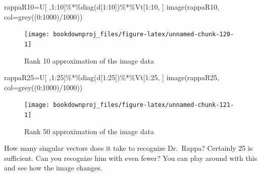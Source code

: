 \documentclass[
]{article}
\newenvironment{Shaded}{\begin{snugshade}}{\end{snugshade}}
\newcommand{\AttributeTok}[1]{\textcolor[rgb]{0.77,0.63,0.00}{#1}}
\newcommand{\DecValTok}[1]{\textcolor[rgb]{0.00,0.00,0.81}{#1}}
\newcommand{\FunctionTok}[1]{\textcolor[rgb]{0.00,0.00,0.00}{#1}}
\newcommand{\NormalTok}[1]{#1}
\newcommand{\OtherTok}[1]{\textcolor[rgb]{0.56,0.35,0.01}{#1}}
\newcommand{\SpecialCharTok}[1]{\textcolor[rgb]{0.00,0.00,0.00}{#1}}
\theoremstyle{definition}
\theoremstyle{definition}
\theoremstyle{definition}
\theoremstyle{definition}
\theoremstyle{remark}
\begin{document}
\begin{Shaded}
\begin{Highlighting}[]
\NormalTok{rappaR10}\OtherTok{=}\NormalTok{U[ ,}\DecValTok{1}\SpecialCharTok{:}\DecValTok{10}\NormalTok{]}\SpecialCharTok{\%*\%}\FunctionTok{diag}\NormalTok{(d[}\DecValTok{1}\SpecialCharTok{:}\DecValTok{10}\NormalTok{])}\SpecialCharTok{\%*\%}\NormalTok{Vt[}\DecValTok{1}\SpecialCharTok{:}\DecValTok{10}\NormalTok{, ]}
\FunctionTok{image}\NormalTok{(rappaR10, }\AttributeTok{col=}\FunctionTok{grey}\NormalTok{((}\DecValTok{0}\SpecialCharTok{:}\DecValTok{1000}\NormalTok{)}\SpecialCharTok{/}\DecValTok{1000}\NormalTok{))}
\end{Highlighting}
\end{Shaded}

\begin{figure}

{\centering \texttt{[image: bookdownproj\_files/figure-latex/unnamed-chunk-120-1]} 

}

\caption{Rank 10 approximation of the image data}\label{fig:unnamed-chunk-120}
\end{figure}

\begin{Shaded}
\begin{Highlighting}[]
\NormalTok{rappaR25}\OtherTok{=}\NormalTok{U[ ,}\DecValTok{1}\SpecialCharTok{:}\DecValTok{25}\NormalTok{]}\SpecialCharTok{\%*\%}\FunctionTok{diag}\NormalTok{(d[}\DecValTok{1}\SpecialCharTok{:}\DecValTok{25}\NormalTok{])}\SpecialCharTok{\%*\%}\NormalTok{Vt[}\DecValTok{1}\SpecialCharTok{:}\DecValTok{25}\NormalTok{, ]}
\FunctionTok{image}\NormalTok{(rappaR25, }\AttributeTok{col=}\FunctionTok{grey}\NormalTok{((}\DecValTok{0}\SpecialCharTok{:}\DecValTok{1000}\NormalTok{)}\SpecialCharTok{/}\DecValTok{1000}\NormalTok{))}
\end{Highlighting}
\end{Shaded}

\begin{figure}

{\centering \texttt{[image: bookdownproj\_files/figure-latex/unnamed-chunk-121-1]} 

}

\caption{Rank 50 approximation of the image data}\label{fig:unnamed-chunk-121}
\end{figure}

How many singular vectors does it take to recognize Dr.~Rappa? Certainly 25 is sufficient. Can you recognize him with even fewer? You can play around with this and see how the image changes.
\end{document}
